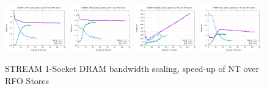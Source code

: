 \documentclass{article}
\begin{document}
\begin{figure}[!ht]
    \centering
    \includegraphics[width=0.24\textwidth]{../data/rome-clx-icx/mem_bw_scale/mb_scale_compact_Copy_nt_rfo}
    \includegraphics[width=0.24\textwidth]{../data/rome-clx-icx/mem_bw_scale/mb_scale_compact_Triad_nt_rfo}
    \includegraphics[width=0.24\textwidth]{../data/rome-clx-icx/mem_bw_scale/mb_scale_compact_Reduce_nt_rfo}
    \includegraphics[width=0.24\textwidth]{../data/rome-clx-icx/mem_bw_scale/mb_scale_compact_Fill_nt_rfo}
    \caption{STREAM 1-Socket DRAM bandwidth scaling, speed-up of NT over RFO Stores}
    \label{figure:mem_bw_scale_compact_nt_rfo}
\end{figure}
\end{document}
